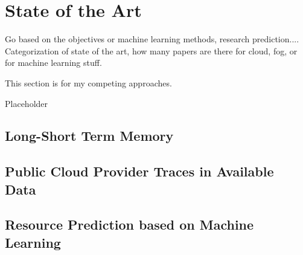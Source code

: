 \chapter{State of the Art}
\label{ch:sota}

    Go based on the objectives or machine learning methods, research prediction....
    Categorization of state of the art, how many papers are there for cloud, fog, or for machine learning stuff.

    This section is for my competing approaches.


        Placeholder
    \section{Long-Short Term Memory}
    \label{sec:lstm-sota}


        
    \section{Public Cloud Provider Traces in Available Data}
    \label{sec:public-cloud-provider-traces-in-available-data-sota}

    \section{Resource Prediction based on Machine Learning}
    \label{sec:resource-prediction-based-on-machine-learning-sota}
